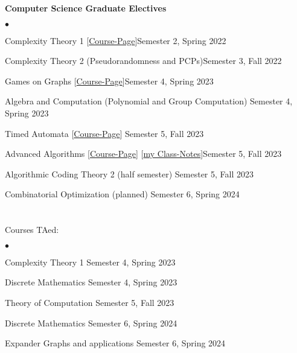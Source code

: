 \documentclass[margin,line, 10pt]{res}
\newenvironment{list2}{
  \begin{list}{$\bullet$}{%
      \setlength{\itemsep}{0in}
      \setlength{\parsep}{0in} \setlength{\parskip}{0in}
      \setlength{\topsep}{0in} \setlength{\partopsep}{0in} 
      \setlength{\leftmargin}{0.2in}}}{\end{list}}
\begin{document}
\begin{resume}
{\bf Computer Science Graduate Electives}
\begin{list2}
    \item Complexity Theory 1 \hspace{0.4em} [\href{https://www.cmi.ac.in/~prajakta/courses/s2022/index.html}{Course-Page}]\hfill Semester 2, Spring 2022
    \item Complexity Theory 2 (Pseudorandomness and PCPs)\hfill Semester 3, Fall 2022
    \item Games on Graphs \hspace{0.4em} [\href{https://www.cmi.ac.in/~sri/Courses/GGRP/2023/index.html}{Course-Page}]\hfill Semester 4, Spring 2023
    \item Algebra and Computation (Polynomial and Group Computation) \hfill Semester 4, Spring 2023
    \item Timed Automata \hspace{0.4em} [\href{https://www.cmi.ac.in/~sri/Courses/TA/2023/index.html}{Course-Page}] \hfill Semester 5, Fall 2023
    \item Advanced Algorithms \hspace{0.4em} [\href{https://www.cmi.ac.in/~prajakta/courses/f2023/index.html}{Course-Page}] \hspace{0.1cm} [\href{https://drive.google.com/file/d/1cAc0n1nwUdwJThporB_nBtJbyXIRuygb/view?usp=drivesdk}{my Class-Notes}]\hfill Semester 5, Fall 2023
    \item Algorithmic Coding Theory 2 (half semester) \hfill Semester 5, Fall 2023
    \item Combinatorial Optimization (planned) \hfill Semester 6, Spring 2024
\end{list2}

\section{}\label{sec: TA}
Courses TAed:
\begin{list2}
    \item Complexity Theory 1 \hfill Semester 4, Spring 2023
    \item Discrete Mathematics \hfill Semester 4, Spring 2023
    \item Theory of Computation \hfill Semester 5, Fall 2023
    \item Discrete Mathematics \hfill Semester 6, Spring 2024
    \item Expander Graphs and applications \hfill Semester 6, Spring 2024
\end{list2}



\end{resume}
\end{document}
